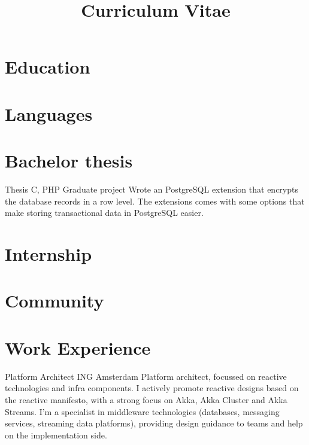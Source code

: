 \documentclass[11pt,a4paper]{moderncv}
\title{Curriculum Vitae}
\begin{document}
\maketitle

\section{Education}

\section{Languages}

\section{Bachelor thesis}
{Thesis}
{C, PHP}
{Graduate project}{}
{
Wrote an PostgreSQL extension that encrypts the database records in a row
level. The extensions comes with some options that make storing transactional
data in PostgreSQL easier.
}

\section{Internship}

\section{Community}

\section{Work Experience}

\vspace*{0.2\baselineskip}
{Platform Architect}
{ING}
{Amsterdam}
{}
{
  Platform architect, focussed on reactive technologies
  and infra components.
  I actively promote reactive designs based on the reactive
  manifesto, with a strong focus on Akka, Akka Cluster and Akka Streams.
  I'm a specialist in middleware technologies (databases, messaging
  services, streaming data platforms), providing design guidance to
  teams and help on the implementation side.
}
\end{document}
